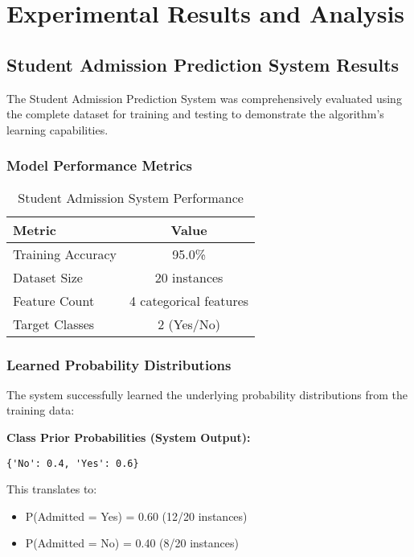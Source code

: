 \documentclass[11pt,a4paper]{article}
\begin{document}
\section{Experimental Results and Analysis}

\subsection{Student Admission Prediction System Results}

The Student Admission Prediction System was comprehensively evaluated using the complete dataset for training and testing to demonstrate the algorithm's learning capabilities.

\subsubsection{Model Performance Metrics}

\begin{table}[H]
\centering
\caption{Student Admission System Performance}
\begin{tabular}{|l|c|}
\hline
\textbf{Metric} & \textbf{Value} \\
\hline
Training Accuracy & 95.0\% \\
Dataset Size & 20 instances \\
Feature Count & 4 categorical features \\
Target Classes & 2 (Yes/No) \\
\hline
\end{tabular}
\end{table}

\subsubsection{Learned Probability Distributions}

The system successfully learned the underlying probability distributions from the training data:

\textbf{Class Prior Probabilities (System Output):}
\begin{lstlisting}[caption=Learned Class Prior Probabilities]
{'No': 0.4, 'Yes': 0.6}
\end{lstlisting}

This translates to:
\begin{itemize}
    \item P(Admitted = Yes) = 0.60 (12/20 instances)
    \item P(Admitted = No) = 0.40 (8/20 instances)
\end{itemize}
\end{document}
